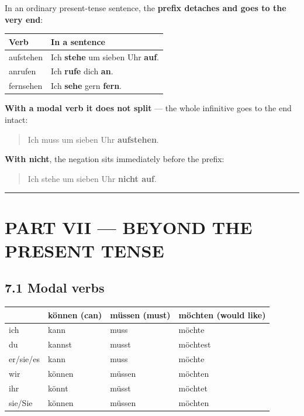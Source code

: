\documentclass[
  11pt,
]{article}
\newcounter{none} %
\begin{document}
In an ordinary present-tense sentence, the \textbf{prefix detaches and
goes to the very end}:

{\def\LTcaptype{none} %
\begin{longtable}[]{@{}ll@{}}
\toprule\noalign{}
Verb & In a sentence \\
\midrule\noalign{}
\endhead
\bottomrule\noalign{}
\endlastfoot
aufstehen & Ich \textbf{stehe} um sieben Uhr \textbf{auf}. \\
anrufen & Ich \textbf{rufe} dich \textbf{an}. \\
fernsehen & Ich \textbf{sehe} gern \textbf{fern}. \\
\end{longtable}
}

\textbf{With a modal verb it does not split} --- the whole infinitive
goes to the end intact:

\begin{quote}
Ich muss um sieben Uhr \textbf{aufstehen}.
\end{quote}

\textbf{With nicht}, the negation sits immediately before the prefix:

\begin{quote}
Ich stehe um sieben Uhr \textbf{nicht auf}.
\end{quote}

\begin{center}\rule{0.5\linewidth}{0.5pt}\end{center}

\section{PART VII --- BEYOND THE PRESENT
TENSE}\label{part-vii-beyond-the-present-tense}

\subsection{7.1 Modal verbs}\label{modal-verbs}

{\def\LTcaptype{none} %
\begin{longtable}[]{@{}llll@{}}
\toprule\noalign{}
& können (can) & müssen (must) & möchten (would like) \\
\midrule\noalign{}
\endhead
\bottomrule\noalign{}
\endlastfoot
ich & kann & muss & möchte \\
du & kannst & musst & möchtest \\
er/sie/es & kann & muss & möchte \\
wir & können & müssen & möchten \\
ihr & könnt & müsst & möchtet \\
sie/Sie & können & müssen & möchten \\
\end{longtable}
}
\end{document}

